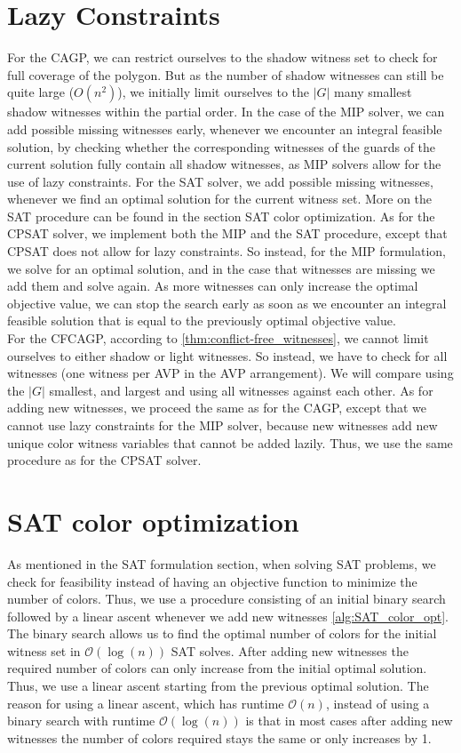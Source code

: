 \section{Lazy Constraints}
For the CAGP, we can restrict ourselves to the shadow witness set to check for full coverage of the polygon. But as the number of shadow witnesses can still be quite large ($O(n^2)$), we initially limit ourselves to the $|G|$ many smallest shadow witnesses within the partial order. In the case of the MIP solver, we can add possible missing witnesses early, whenever we encounter an integral feasible solution, by checking whether the corresponding witnesses of the guards of the current solution fully contain all shadow witnesses, as MIP solvers allow for the use of lazy constraints. For the SAT solver, we add possible missing witnesses, whenever we find an optimal solution for the current witness set. More on the SAT procedure can be found in the section SAT color optimization. As for the CPSAT solver, we implement both the MIP and the SAT procedure, except that CPSAT does not allow for lazy constraints. So instead, for the MIP formulation, we solve for an optimal solution, and in the case that witnesses are missing we add them and solve again. As more witnesses can only increase the optimal objective value, we can stop the search early as soon as we encounter an integral feasible solution that is equal to the previously optimal objective value.\\
For the CFCAGP, according to \cref{thm:conflict-free_witnesses}, we cannot limit ourselves to either shadow or light witnesses. So instead, we have to check for all witnesses (one witness per AVP in the AVP arrangement). We will compare using the $|G|$ smallest, and largest and using all witnesses against each other. As for adding new witnesses, we proceed the same as for the CAGP, except that we cannot use lazy constraints for the MIP solver, because new witnesses add new unique color witness variables that cannot be added lazily. Thus, we use the same procedure as for the CPSAT solver.

\section{SAT color optimization}
As mentioned in the SAT formulation section, when solving SAT problems, we check for feasibility instead of having an objective function to minimize the number of colors. Thus, we use a procedure consisting of an initial binary search followed by a linear ascent whenever we add new witnesses \cref{alg:SAT_color_opt}. The binary search allows us to find the optimal number of colors for the initial witness set in $\mathcal{O}(\log(n))$ SAT solves. After adding new witnesses the required number of colors can only increase from the initial optimal solution. Thus, we use a linear ascent starting from the previous optimal solution. The reason for using a linear ascent, which has runtime $\mathcal{O}(n)$, instead of using a binary search with runtime $\mathcal{O}(\log(n))$ is that in most cases after adding new witnesses the number of colors required stays the same or only increases by 1.

